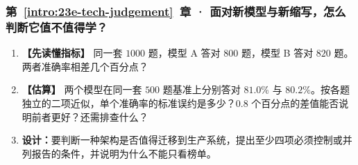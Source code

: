 \subsubsection*{第~\ref*{intro:23e-tech-judgement}~章 · 面对新模型与新缩写，怎么判断它值不值得学？}
\begin{enumerate}[label={},leftmargin=4.8em,itemsep=4pt]
\item[\textbf{C-121.}] \leavevmode{}\label{exercise:C-121}\label{exercise:metric-percentage-points}\textbf{【先读懂指标】} 同一套 $1000$ 题，模型 A 答对 $800$ 题，模型 B 答对 $820$ 题。两者准确率相差几个百分点？
\item[\textbf{C-122.}] \leavevmode{}\label{exercise:C-122}\label{exercise:benchmark-count-gap}\textbf{【估算】} 两个模型在同一套 $500$ 题基准上分别答对 $81.0\%$ 与 $80.2\%$。按各题独立的二项近似，单个准确率的标准误约是多少？$0.8$ 个百分点的差值能否说明前者更好？还需排查什么？
\item[\textbf{C-123.}] \leavevmode{}\label{exercise:C-123}\label{exercise:production-architecture-evaluation}\textbf{设计：}要判断一种架构是否值得迁移到生产系统，提出至少四项必须控制或并列报告的条件，并说明为什么不能只看榜单。
\end{enumerate}
